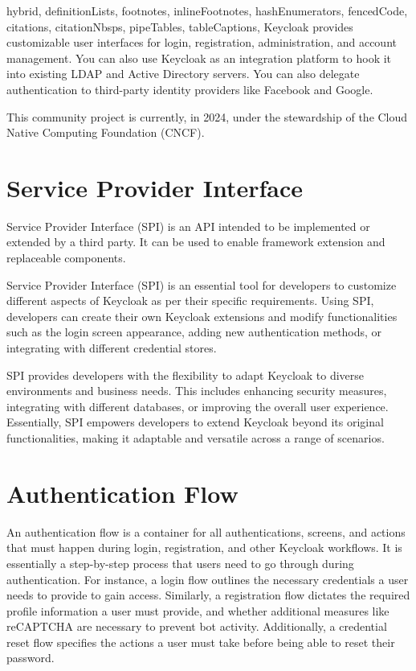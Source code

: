 \documentclass[
  digital,     %
  oneside,     %
  nosansbold,  %
  nocolorbold, %
  lof,         %
  lot,         %
]{fithesis4}
\begin{document}
\begin{markdown*}{%
  hybrid,
  definitionLists,
  footnotes,
  inlineFootnotes,
  hashEnumerators,
  fencedCode,
  citations,
  citationNbsps,
  pipeTables,
  tableCaptions,
}
Keycloak provides customizable user interfaces for login, registration, administration, and account management.
You can also use Keycloak as an integration platform to hook it into existing LDAP and Active Directory servers.
You can also delegate authentication to third-party identity providers like Facebook and Google.

This community project is currently, in 2024, under the stewardship of the Cloud Native Computing Foundation (CNCF).\cite{keycloak-web}


\newpage
\section{Service Provider Interface}
Service Provider Interface (SPI) is an API intended to be implemented or extended by a third party.
It can be used to enable framework extension and replaceable components.\cite{keycloak-spi}

Service Provider Interface (SPI) is an essential tool for developers to customize different aspects of Keycloak as per their specific requirements.
Using SPI, developers can create their own Keycloak extensions and modify functionalities such as the login screen appearance, adding new authentication methods, or integrating with different credential stores.

SPI provides developers with the flexibility to adapt Keycloak to diverse environments and business needs.
This includes enhancing security measures, integrating with different databases, or improving the overall user experience. Essentially, SPI empowers developers to extend Keycloak beyond its original functionalities, making it adaptable and versatile across a range of scenarios.

\section{Authentication Flow}
An authentication flow is a container for all authentications, screens, and actions that must happen during login, registration, and other Keycloak workflows.
It is essentially a step-by-step process that users need to go through during authentication.
For instance, a login flow outlines the necessary credentials a user needs to provide to gain access.
Similarly, a registration flow dictates the required profile information a user must provide, and whether additional measures like reCAPTCHA are necessary to prevent bot activity.
Additionally, a credential reset flow specifies the actions a user must take before being able to reset their password. \cite{keycloak-auth-flows}


\end{markdown*}
\end{document}
